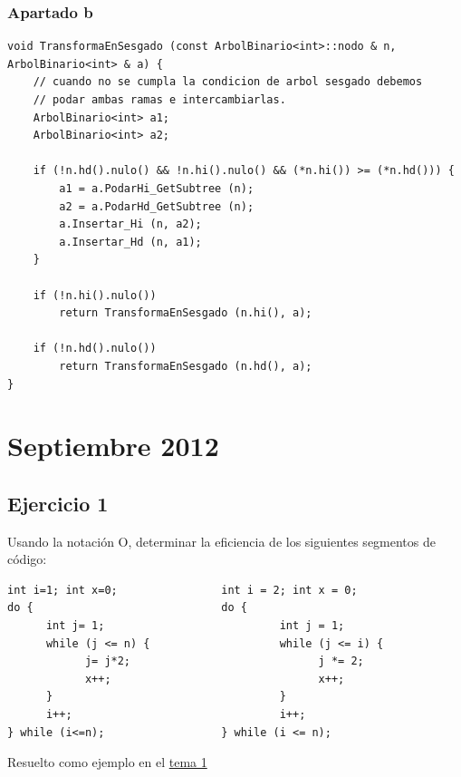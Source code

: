 \documentclass[10pt,a4paper,spanish]{report}
\begin{document}
\subsubsection{\textcolor[rgb]{0.5,0.8,1}Apartado b}

\begin{verbatim}
void TransformaEnSesgado (const ArbolBinario<int>::nodo & n, ArbolBinario<int> & a) {
    // cuando no se cumpla la condicion de arbol sesgado debemos 
    // podar ambas ramas e intercambiarlas.
    ArbolBinario<int> a1;
    ArbolBinario<int> a2;

    if (!n.hd().nulo() && !n.hi().nulo() && (*n.hi()) >= (*n.hd())) {
        a1 = a.PodarHi_GetSubtree (n);
        a2 = a.PodarHd_GetSubtree (n);
        a.Insertar_Hi (n, a2);
        a.Insertar_Hd (n, a1);
    }

    if (!n.hi().nulo())
        return TransformaEnSesgado (n.hi(), a);

    if (!n.hd().nulo())
        return TransformaEnSesgado (n.hd(), a);
}
\end{verbatim}

\section{\textcolor[rgb]{0.5,0.8,1}Septiembre 2012}
\subsection{\textcolor[rgb]{0.5,0.8,1}Ejercicio 1}
\noindent
Usando la notación O, determinar la eficiencia de los siguientes segmentos de código:
\begin{verbatim}
int i=1; int x=0;                int i = 2; int x = 0;
do {                             do {
      int j= 1;                           int j = 1;
      while (j <= n) {                    while (j <= i) {
            j= j*2;                             j *= 2;
            x++;                                x++;
      }                                   }
      i++;                                i++;
} while (i<=n);                  } while (i <= n);
\end{verbatim}

\noindent
Resuelto como ejemplo en el \hyperref[eficiencia_sept2012]{tema 1}
\end{document}

